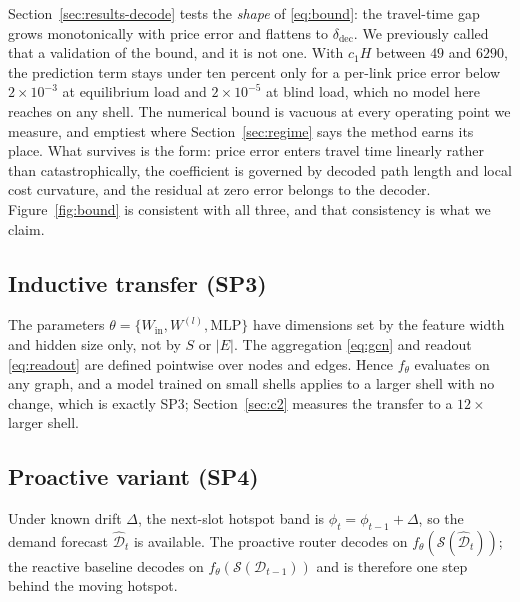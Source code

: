 \documentclass[journal]{IEEEtran}
\begin{document}
Section~\ref{sec:results-decode} tests the \emph{shape} of \eqref{eq:bound}: the travel-time gap
grows monotonically with price error and flattens to $\delta_{\mathrm{dec}}$. We previously called
that a validation of the bound, and it is not one. With $c_1H$ between $49$ and $6290$, the
prediction term stays under ten percent only for a per-link price error below $2\times10^{-3}$ at
equilibrium load and $2\times10^{-5}$ at blind load, which no model here reaches on any shell. The
numerical bound is vacuous at every operating point we measure, and emptiest where
Section~\ref{sec:regime} says the method earns its place. What survives is the form: price error
enters travel time linearly rather than catastrophically, the coefficient is governed by decoded
path length and local cost curvature, and the residual at zero error belongs to the decoder.
Figure~\ref{fig:bound} is consistent with all three, and that consistency is what we claim.

\subsection{Inductive transfer (SP3)}\label{sec:induct}
The parameters $\theta=\{W_{\mathrm{in}},W^{(l)},\mathrm{MLP}\}$ have dimensions set by
the feature width and hidden size only, not by $S$ or $|E|$. The aggregation
\eqref{eq:gcn} and readout \eqref{eq:readout} are defined pointwise over nodes and
edges. Hence $f_\theta$ evaluates on any graph, and a model trained on small shells
applies to a larger shell with no change, which is exactly SP3; Section~\ref{sec:c2}
measures the transfer to a $12\times$ larger shell.

\subsection{Proactive variant (SP4)}
Under known drift $\Delta$, the next-slot hotspot band is $\phi_t=\phi_{t-1}+\Delta$, so
the demand forecast $\hat{\mathcal{D}}_t$ is available. The proactive router decodes on
$f_\theta(\mathcal{S}(\hat{\mathcal{D}}_t))$; the reactive baseline decodes on
$f_\theta(\mathcal{S}(\mathcal{D}_{t-1}))$ and is therefore one step behind the moving
hotspot.
\end{document}
